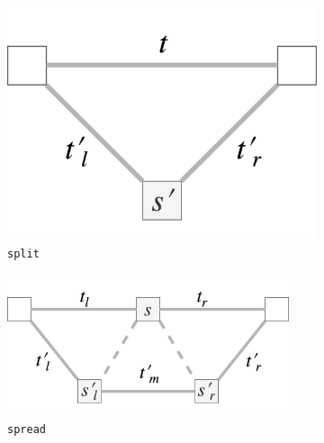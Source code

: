 \documentclass[12pt,a4paper,twoside,openany]{report} \usepackage[pdfborder={0 0 0}]{hyperref}    %
\theoremstyle{definition} \newtheorem{definition}{Definition}[section]
\begin{document}
  \begin{figure}[ht] \centering 
    \begin{subfigure}[t]{.23\textwidth}
    \centering\includegraphics[keepaspectratio,width=\textwidth]{prep/outer/split} 
    \caption{\texttt{split}}
    \label{fig:splitOp} 
    \end{subfigure} 
    \begin{subfigure}[t]{.38\textwidth}
    \centering\includegraphics[keepaspectratio,width=0.91\textwidth]{prep/outer/spread} 
    \caption{\texttt{spread}}
    \label{fig:spreadOP} 
    \end{subfigure} 
    \begin{subfigure}[t]{.20\textwidth}
    \centering

\end{subfigure}
\end{figure}
\end{document}
